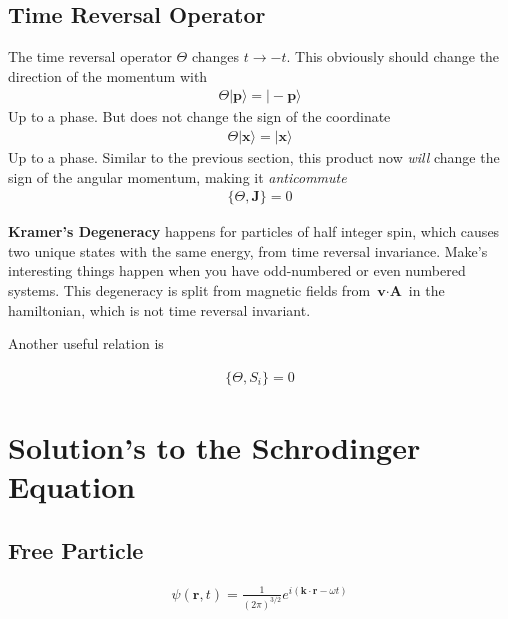 \subsection{Time Reversal Operator}
The time reversal operator $\Theta$ changes $t\rightarrow -t$. This obviously should change the direction of the momentum with
\begin{align}
\Theta |\textbf{p}\rangle = |-\textbf{p}\rangle
\end{align}
Up to a phase. But does not change the sign of the coordinate
\begin{align}
\Theta |\textbf{x}\rangle = |\textbf{x}\rangle
\end{align}
Up to a phase. Similar to the previous section, this product now \emph{will} change the sign of the angular momentum, making it \emph{anticommute}
\begin{align}
\{\Theta, \textbf{J}\} = 0
\end{align}








\textbf{Kramer's Degeneracy} happens for particles of half integer spin, which causes two unique states with the same energy, from time reversal invariance. Make's interesting things happen when you have odd-numbered or even numbered systems. This degeneracy is split from magnetic fields from $\textbf{v}\cdot\textbf{A}$ in the hamiltonian, which is not time reversal invariant. 

Another useful relation is

\begin{align}
\{\Theta,S_i\} = 0
\end{align}


\section{Solution's to the Schrodinger Equation}

\subsection{Free Particle}
\begin{align}
    \psi(\textbf{r},t) = \frac{1}{(2\pi)^{3/2}}e^{i(\textbf{k}\cdot\textbf{r} - \omega t)}
\end{align}


